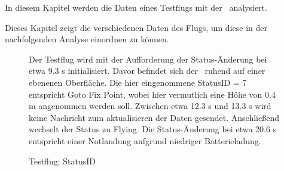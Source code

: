 
In diesem Kapitel werden die Daten eines Testflugs mit der \Ar\ analysiert.






Dieses Kapitel zeigt die verschiedenen Daten des Flugs, um diese in der nachfolgenden Analyse einordnen zu können.



\begin{figure}[ht!]
\vspace{0.25cm}
\begin{center}
\caption{Testflug: StatusID}
\label{fig:FlightStatus}
\end{center}

\vspace{0.25cm}
Der Testflug wird mit der Aufforderung der Status-Änderung bei etwa 9.3 s initialisiert. Davor befindet sich der \Quad\ ruhend auf einer ebenenen Oberfläche.
Die hier eingenommene StatusID = 7 entspricht \glq Goto Fix Point\grq, wobei hier vermutlich eine Höhe von 0.4 m angenommen werden soll. Zwischen etwa 12.3 s und 13.3 s wird keine Nachricht zum aktualisieren der Daten gesendet. Anschließend wechselt der Status zu \grq Flying\glq.
Die Status-Änderung bei etwa 20.6 s entspricht einer Notlandung aufgrund niedriger Batterieladung.
\end{figure}


